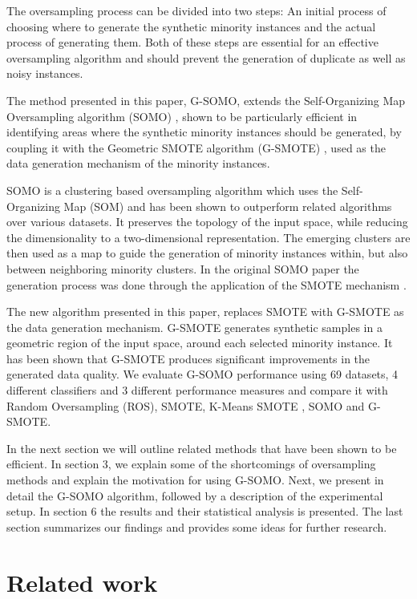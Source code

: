 \documentclass[parskip=full]{scrartcl}
\begin{document}
The oversampling process can be divided into two steps: An initial process of choosing where to generate the synthetic minority instances and the actual process of generating them. Both of these steps are essential for an effective oversampling algorithm and should prevent the generation of duplicate as well as noisy instances.

The method presented in this paper, G-SOMO, extends the Self-Organizing Map Oversampling algorithm (SOMO) \cite{Douzas2017}, shown to be particularly efficient in identifying areas where the synthetic minority instances should be generated, by coupling it with the Geometric SMOTE algorithm (G-SMOTE) \cite{Douzas2019}, used as the data generation mechanism of the minority instances.

SOMO is a clustering based oversampling algorithm which uses the Self-Organizing Map (SOM) and has been shown to outperform related algorithms over various datasets. It preserves the topology of the input space, while reducing the dimensionality to a two-dimensional representation. The emerging clusters are then used as a map to guide the generation of minority instances within, but also between neighboring minority clusters. In the original SOMO paper the generation process was done through the application of the SMOTE mechanism \cite{Chawla2002}.

The new algorithm presented in this paper, replaces SMOTE with G-SMOTE as the data generation mechanism. G-SMOTE generates synthetic samples in a geometric region of the input space, around each selected minority instance. It has been shown that G-SMOTE produces significant improvements in the generated data quality. We evaluate G-SOMO performance using 69 datasets, 4 different classifiers and 3 different performance measures and compare it with Random Oversampling (ROS), SMOTE, K-Means SMOTE \cite{Douzas2018}, SOMO and G-SMOTE.

In the next section we will outline related methods that have been shown to be efficient. In section 3, we explain some of the shortcomings of oversampling methods and explain the motivation for using G-SOMO. Next, we present in detail the G-SOMO algorithm, followed by a description of the experimental setup. In section 6 the results and their statistical analysis is presented. The last section summarizes our findings and provides some ideas for further research.

\section{Related work}
\end{document}
